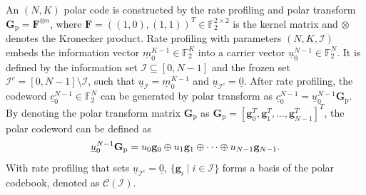 \documentclass[12pt, draftclsnofoot, peerreview, onecolumn]{IEEEtran}
\theoremstyle{noparent}
\begin{document}
An $(N, K)$ polar code is constructed by the rate profiling
and polar transform $\mathbf{G}_{\mathrm{p}}=\mathbf{F}^{\otimes n}$, 
where $\mathbf{F}=((1,0),(1,1))^{T} \in \mathbb{F}_{2}^{2 \times 2}$ 
is the kernel matrix and $\otimes$ denotes the Kronecker product.
Rate profiling with parameters $(N,K,\mathcal{I})$ embeds the information vector
$\underline{m}_{0}^{K-1} \in \mathbb{F}_{2}^{K}$ into a carrier vector 
$\underline{u}_{0}^{N-1} \in \mathbb{F}_{2}^{N}$.
It is defined by the information set $\mathcal{I} \subseteq [0,N-1]$ 
and the frozen set $\mathcal{I}^c=[0, N-1]\setminus\mathcal{I}$,
such that
$\underline{u}_{\mathcal{I}}=\underline{m}_{0}^{K-1}$ and $\underline{u}_{\mathcal{I}^c}=\underline{0}$.
After rate profiling, the codeword $\underline{c}_{0}^{N-1} \in \mathbb{F}_{2}^{N}$ can be generated by
polar transform as $\underline{c}_{0}^{N-1}=\underline{u}_{0}^{N-1} \mathbf{G}_{\mathrm{p}}$.
By denoting the polar transform matrix $\mathbf{G}_{\mathrm{p}}$ as
$\mathbf{G}_{\mathrm{p}}=[\mathbf{g}_0^T, \mathbf{g}_1^T, \ldots, \mathbf{g}_{N-1}^T]^T$,
the polar codeword can be defined as 
\begin{equation}
    \underline{u}_{0}^{N-1}\mathbf{G}_{\mathrm{p}}=u_{0}\mathbf{g}_{0}\oplus u_{1}\mathbf{g}_{1}\oplus \cdots \oplus u_{N-1}\mathbf{g}_{N-1}. \\
    \label{linear_combination_of_rows}
\end{equation}
With rate profiling that sets $\underline{u}_{\mathcal{I}^{c}}=\underline{0}$,
$\{\mathbf{g}_i \mid i\in\mathcal{I} \}$ forms a basis of the polar codebook, denoted as $\mathcal{C}(\mathcal{I})$.
\end{document}
